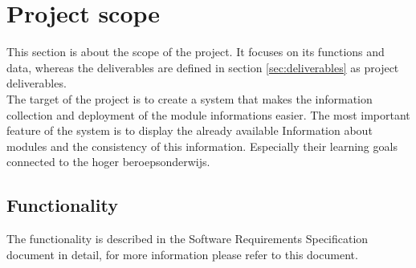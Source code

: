 \section{Project scope}
This section is about the scope of the project. It focuses on its functions and data, whereas the deliverables
are defined in section \eqref{sec:deliverables} as project deliverables.
\newline \\
The target of the project is to create a system that makes the information collection and deployment of the module informations
easier. The most important feature of the system is to display the already available Information about modules and the consistency
of this information. Especially their learning goals connected to the hoger beroepsonderwijs.
    
    \subsection{Functionality}
    The functionality is described in the Software Requirements Specification document in detail,
    for more information please refer to this document.


